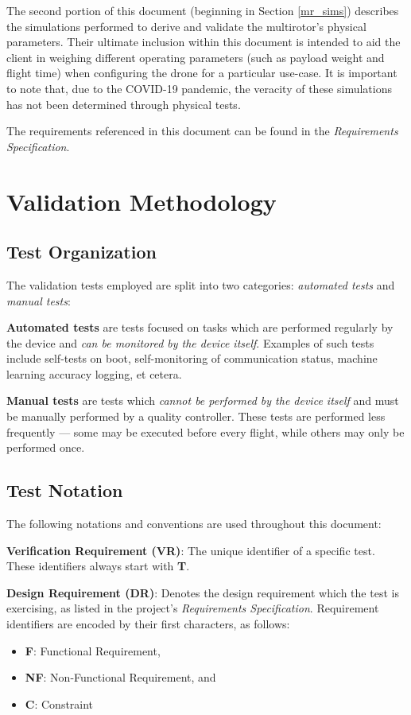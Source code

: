 \documentclass[10pt,letterpaper]{article}
\begin{document}
The second portion of this document (beginning in Section \ref{mr_sims}) describes the simulations performed to derive and validate the multirotor's physical parameters. Their ultimate inclusion within this document is intended to aid the client in weighing different operating parameters (such as payload weight and flight time) when configuring the drone for a particular use-case. It is important to note that, due to the COVID-19 pandemic, the veracity of these simulations has not been determined through physical tests.

The requirements referenced in this document can be found in the \textit{Requirements Specification}.

\section{Validation Methodology}

\subsection{Test Organization}\label{auto}
The validation tests employed are split into two categories: \textit{automated tests} and \textit{manual tests}:

\textbf{Automated tests} are tests focused on tasks which are performed regularly by the device and \textit{can be monitored by the device itself}. Examples of such tests include self-tests on boot, self-monitoring of communication status, machine learning accuracy logging, et cetera.

\textbf{Manual tests} are tests which \textit{cannot be performed by the device itself} and must be manually performed by a quality controller. These tests are performed less frequently --- some may be executed before every flight, while others may only be performed once. 

\subsection{Test Notation}
The following notations and conventions are used throughout this document:

\textbf{Verification Requirement (VR)}: The unique identifier of a specific test. These identifiers always start with \textbf{T}.

\textbf{Design Requirement (DR)}: Denotes the design requirement which the test is exercising, as listed in the project's \textit{Requirements Specification}. Requirement identifiers are encoded by their first characters, as follows:
\begin{itemize}
	\item \textbf{F}: Functional Requirement,
	\item \textbf{NF}: Non-Functional Requirement, and
	\item \textbf{C}: Constraint
\end{itemize}
\end{document}
